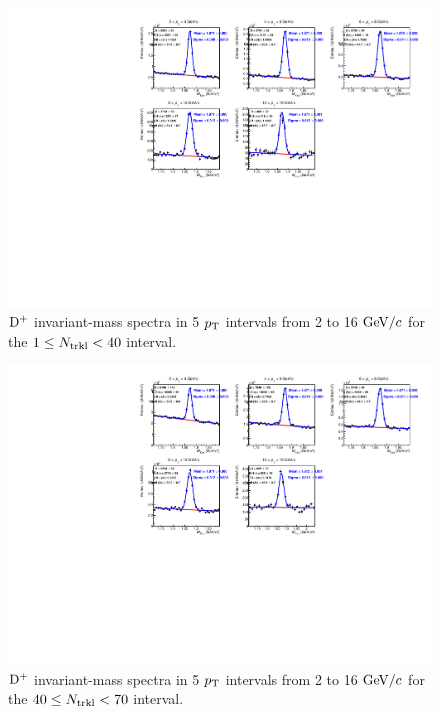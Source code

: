 \begin{figure}[htpb]
\centering
 \includegraphics[width=.9\textwidth]{FigCap6/RawYields_Central_d0Cut_Ntrklts_1_39_sigmafixtoMB.pdf}
 \caption{${\rm D^+}$ invariant-mass spectra in 5 $p_{\rm T}$ intervals from 2 to 16 $\mathrm{GeV}/c$ for the $1 \leq N_{\rm trkl} < 40$ interval.}
 \label{fig:DplusInvMassVsNtrkl_1}
\end{figure}

\begin{figure}[htpb]
\centering
 \includegraphics[width=.9\textwidth]{FigCap6/RawYields_Central_d0Cut_Ntrklts_40_69_sigmafixtoMB.pdf}
 \caption{${\rm D^+}$ invariant-mass spectra in 5 $p_{\rm T}$ intervals from 2 to 16 $\mathrm{GeV}/c$ for the $40 \leq N_{\rm trkl} < 70$ interval.}
 \label{fig:DplusInvMassVsNtrkl_2}
\end{figure}

